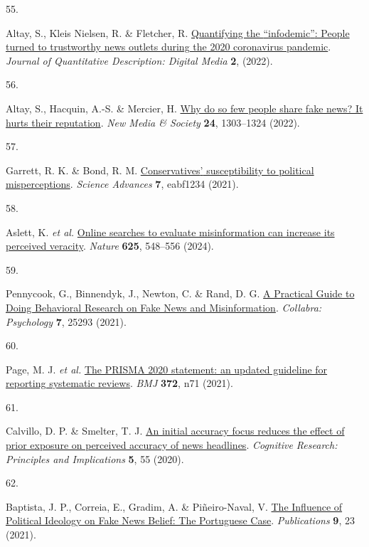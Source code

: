 \documentclass[
  doc,floatsintext]{apa6}
\newlength{\cslhangindent}
\newlength{\csllabelwidth}
\newenvironment{CSLReferences}[2] %
 {\begin{list}{}{%
  \setlength{\itemindent}{0pt}
  \setlength{\leftmargin}{0pt}
  \setlength{\parsep}{0pt}
  \ifodd #1
   \setlength{\leftmargin}{\cslhangindent}
   \setlength{\itemindent}{-1\cslhangindent}
  \fi
  \setlength{\itemsep}{#2\baselineskip}}}
 {\end{list}}
\newcommand{\CSLLeftMargin}[1]{\parbox[t]{\csllabelwidth}{\strut#1\strut}}
\newcommand{\CSLRightInline}[1]{\parbox[t]{\linewidth - \csllabelwidth}{\strut#1\strut}}
\begin{document}
\begin{CSLReferences}{0}{0}
\CSLLeftMargin{55. }%
\CSLRightInline{Altay, S., Kleis Nielsen, R. \& Fletcher, R. \href{https://doi.org/10.51685/jqd.2022.020}{Quantifying the {``}infodemic{''}: People turned to trustworthy news outlets during the 2020 coronavirus pandemic}. \emph{Journal of Quantitative Description: Digital Media} \textbf{2}, (2022).}

\CSLLeftMargin{56. }%
\CSLRightInline{Altay, S., Hacquin, A.-S. \& Mercier, H. \href{https://doi.org/10.1177/1461444820969893}{Why do so few people share fake news? It hurts their reputation}. \emph{New Media \& Society} \textbf{24}, 1303--1324 (2022).}

\CSLLeftMargin{57. }%
\CSLRightInline{*Garrett, R. K. \& Bond, R. M. \href{https://doi.org/10.1126/sciadv.abf1234}{Conservatives{'} susceptibility to political misperceptions}. \emph{Science Advances} \textbf{7}, eabf1234 (2021).}

\CSLLeftMargin{58. }%
\CSLRightInline{*Aslett, K. \emph{et al.} \href{https://doi.org/10.1038/s41586-023-06883-y}{Online searches to evaluate misinformation can increase its perceived veracity}. \emph{Nature} \textbf{625}, 548--556 (2024).}

\CSLLeftMargin{59. }%
\CSLRightInline{*Pennycook, G., Binnendyk, J., Newton, C. \& Rand, D. G. \href{https://doi.org/10.1525/collabra.25293}{A Practical Guide to Doing Behavioral Research on Fake News and Misinformation}. \emph{Collabra: Psychology} \textbf{7}, 25293 (2021).}

\CSLLeftMargin{60. }%
\CSLRightInline{Page, M. J. \emph{et al.} \href{https://doi.org/10.1136/bmj.n71}{The PRISMA 2020 statement: an updated guideline for reporting systematic reviews}. \emph{BMJ} \textbf{372}, n71 (2021).}

\CSLLeftMargin{61. }%
\CSLRightInline{Calvillo, D. P. \& Smelter, T. J. \href{https://doi.org/10.1186/s41235-020-00257-y}{An initial accuracy focus reduces the effect of prior exposure on perceived accuracy of news headlines}. \emph{Cognitive Research: Principles and Implications} \textbf{5}, 55 (2020).}

\CSLLeftMargin{62. }%
\CSLRightInline{Baptista, J. P., Correia, E., Gradim, A. \& Piñeiro-Naval, V. \href{https://doi.org/10.3390/publications9020023}{The Influence of Political Ideology on Fake News Belief: The Portuguese Case}. \emph{Publications} \textbf{9}, 23 (2021).}


\end{CSLReferences}
\end{document}
